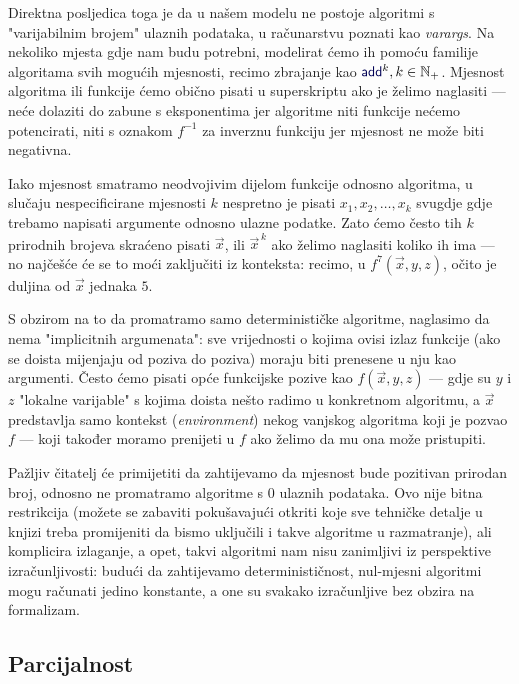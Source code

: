 Direktna posljedica toga je da u našem modelu ne postoje algoritmi s "varijabilnim brojem" ulaznih podataka, u računarstvu poznati kao \emph{varargs}. Na nekoliko mjesta gdje nam budu potrebni, modelirat ćemo ih pomoću familije algoritama svih mogućih mjesnosti, recimo zbrajanje kao $\f{add}^k,k\in\N_+$. Mjesnost algoritma ili funkcije ćemo obično pisati u superskriptu ako je želimo naglasiti --- neće dolaziti do zabune s eksponentima jer algoritme niti funkcije nećemo potencirati, niti s oznakom $f^{-1}$ za inverznu funkciju jer mjesnost ne može biti negativna.

Iako mjesnost smatramo neodvojivim dijelom funkcije odnosno algoritma, u slučaju nespecificirane mjesnosti $k$ nespretno je pisati $x_1,x_2,\dotsc,x_k$ svugdje gdje trebamo napisati argumente odnosno ulazne podatke. Zato ćemo često tih $k$ prirodnih brojeva skraćeno pisati $\vec x$, ili $\vec x^{\,k}$ ako želimo naglasiti koliko ih ima --- no najčešće će se to moći zaključiti iz konteksta: recimo, u $f^7(\vec x,y,z)$, očito je duljina od $\vec x$ jednaka $5$.

\begin{napomena}\label{nap:blokovi}
S obzirom na to da promatramo samo determinističke algoritme, naglasimo da nema "implicitnih argumenata": sve vrijednosti o kojima ovisi izlaz funkcije (ako se doista mijenjaju od poziva do poziva) moraju biti prenesene u nju kao argumenti. Često ćemo pisati opće funkcijske pozive kao $f(\vec x,y,z)$ --- gdje su $y$ i $z$ "lokalne varijable" s kojima doista nešto radimo u konkretnom algoritmu, a $\vec x$ predstavlja samo kontekst (\emph{environment}) nekog vanjskog algoritma koji je pozvao $f$ --- koji također moramo prenijeti u $f$ ako želimo da mu ona može pristupiti.
\end{napomena}

Pažljiv čitatelj će primijetiti da zahtijevamo da mjesnost bude pozitivan prirodan broj, odnosno ne promatramo algoritme s $0$ ulaznih podataka. Ovo nije bitna restrikcija (možete se zabaviti pokušavajući otkriti koje sve tehničke detalje u knjizi treba promijeniti da bismo uključili i takve algoritme u razmatranje), ali komplicira izlaganje, a opet, takvi algoritmi nam nisu zanimljivi iz perspektive izračunljivosti: budući da zahtijevamo determinističnost, nul-mjesni algoritmi mogu računati jedino konstante, a one su svakako izračunljive bez obzira na formalizam.

\subsection{Parcijalnost}

